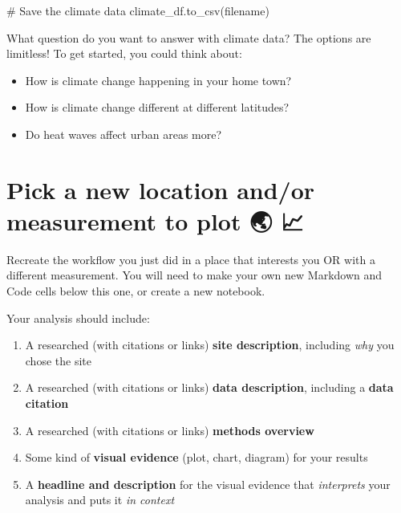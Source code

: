 \documentclass[
  letterpaper,
  DIV=11,
  numbers=noendperiod,
  oneside]{scrreprt}
\newenvironment{Shaded}{\begin{snugshade}}{\end{snugshade}}
\newcommand{\CommentTok}[1]{\textcolor[rgb]{0.37,0.37,0.37}{#1}}
\newcommand{\NormalTok}[1]{\textcolor[rgb]{0.00,0.23,0.31}{#1}}
\newcommand{\StringTok}[1]{\textcolor[rgb]{0.13,0.47,0.30}{#1}}
\providecommand{\tightlist}{%
  \setlength{\itemsep}{0pt}\setlength{\parskip}{0pt}}
\begin{document}
\begin{Shaded}
\begin{Highlighting}[]
\CommentTok{\# Save the climate data}
\NormalTok{climate\_df.to\_csv(}\StringTok{\textquotesingle{}filename\textquotesingle{}}\NormalTok{)}
\end{Highlighting}
\end{Shaded}

\begin{tcolorbox}[enhanced jigsaw, colbacktitle=quarto-callout-color!10!white, opacityback=0, bottomtitle=1mm, toptitle=1mm, bottomrule=.15mm, left=2mm, colframe=quarto-callout-color-frame, leftrule=.75mm, opacitybacktitle=0.6, colback=white, rightrule=.15mm, toprule=.15mm, breakable, titlerule=0mm, title=\textcolor{quarto-callout-color}{\faInfo}\hspace{0.5em}{Reflect and Respond}, coltitle=black, arc=.35mm]

What question do you want to answer with climate data? The options are
limitless! To get started, you could think about:

\begin{itemize}
\tightlist
\item
  How is climate change happening in your home town?
\item
  How is climate change different at different latitudes?
\item
  Do heat waves affect urban areas more?
\end{itemize}

\end{tcolorbox}

\section{Pick a new location and/or measurement to plot 🌏
📈}\label{pick-a-new-location-andor-measurement-to-plot}

Recreate the workflow you just did in a place that interests you OR with
a different measurement. You will need to make your own new Markdown and
Code cells below this one, or create a new notebook.

Your analysis should include:

\begin{enumerate}
\def\labelenumi{\arabic{enumi}.}
\tightlist
\item
  A researched (with citations or links) \textbf{site description},
  including \emph{why} you chose the site
\item
  A researched (with citations or links) \textbf{data description},
  including a \textbf{data citation}
\item
  A researched (with citations or links) \textbf{methods overview}
\item
  Some kind of \textbf{visual evidence} (plot, chart, diagram) for your
  results
\item
  A \textbf{headline and description} for the visual evidence that
  \emph{interprets} your analysis and puts it \emph{in context}
\end{enumerate}
\end{document}
